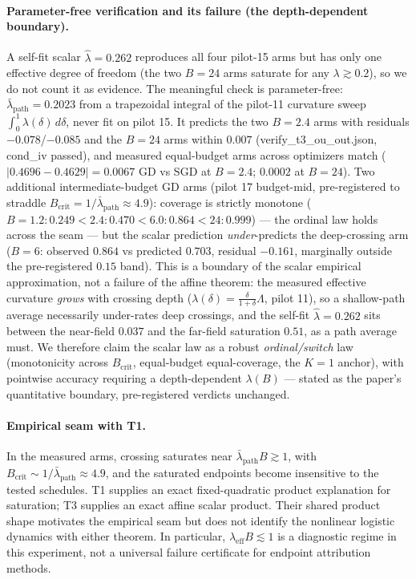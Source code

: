 \documentclass{article}
\newcommand{\B}{B}            %
\newcommand{\lam}{\lambda}
\newcommand{\lameff}{\lam_{\mathrm{eff}}}
\newcommand{\lampath}{\bar{\lam}_{\mathrm{path}}}
\begin{document}
\paragraph{Parameter-free verification and its failure (the depth-dependent boundary).}
A self-fit scalar $\hat\lambda=0.262$ reproduces all four pilot-15 arms but has only one
effective degree of freedom (the two $\B=24$ arms saturate for any $\lambda\gtrsim0.2$), so we
do not count it as evidence. The meaningful check is parameter-free: $\lampath=0.2023$ from a
trapezoidal integral of the pilot-11 curvature sweep $\int_0^1\lambda(\delta)\,d\delta$, never
fit on pilot 15. It predicts the two $\B=2.4$ arms with residuals $-0.078$/$-0.085$ and the
$\B=24$ arms within $0.007$ (verify\_t3\_ou\_out.json, cond\_iv passed), and measured
equal-budget arms across optimizers match ($|0.4696-0.4629|=0.0067$ GD vs SGD at $\B=2.4$;
$0.0002$ at $\B=24$). Two additional intermediate-budget GD arms (pilot 17 budget-mid,
pre-registered to straddle $\B_{\mathrm{crit}}=1/\lampath\approx4.9$): coverage is strictly monotone
($\B=1.2: 0.249 < 2.4: 0.470 < 6.0: 0.864 < 24: 0.999$) --- the ordinal law holds across the
seam --- but the scalar prediction \emph{under}-predicts the deep-crossing arm
($\B=6$: observed $0.864$ vs predicted $0.703$, residual $-0.161$, marginally outside the
pre-registered $0.15$ band). This is a boundary of the scalar empirical approximation, not a
failure of the affine theorem: the measured effective curvature \emph{grows} with crossing depth
($\lambda(\delta)=\frac{\delta}{1+\delta}\Lambda$, pilot 11), so a shallow-path average
necessarily under-rates deep crossings, and the self-fit $\hat\lambda=0.262$ sits between the
near-field $0.037$ and the far-field saturation $0.51$, as a path average must. We therefore
claim the scalar law as a robust \emph{ordinal/switch} law (monotonicity across
$\B_{\mathrm{crit}}$, equal-budget equal-coverage, the $K{=}1$ anchor), with pointwise
accuracy requiring a depth-dependent $\lambda(\B)$ --- stated as the paper's quantitative
boundary, pre-registered verdicts unchanged.

\paragraph{Empirical seam with T1.} In the measured arms, crossing saturates near
$\lampath\B\gtrsim1$, with $\B_{\mathrm{crit}}\sim1/\lampath\approx4.9$, and the saturated
endpoints become insensitive to the tested schedules. T1 supplies an exact fixed-quadratic
product explanation for saturation; T3 supplies an exact affine scalar product. Their shared
product shape motivates the empirical seam but does not identify the nonlinear logistic
dynamics with either theorem. In particular, $\lameff\B\lesssim1$ is a diagnostic regime in
this experiment, not a universal failure certificate for endpoint attribution methods.
\end{document}
